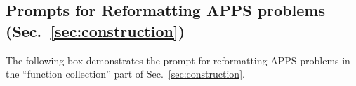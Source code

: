             




            

\subsection{Prompts for Reformatting APPS problems (Sec.~\ref{sec:construction})}
\label{sec:rewrite}
The following box demonstrates the prompt for reformatting APPS problems in the ``function collection'' part of Sec.~\ref{sec:construction}.

